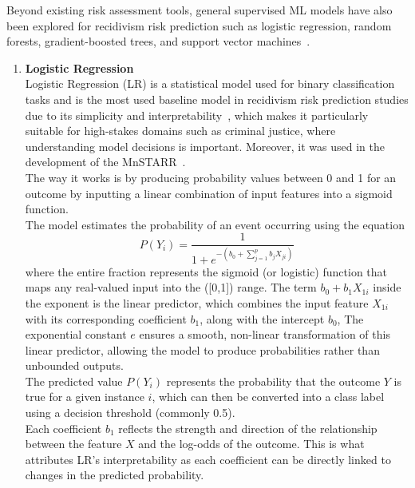 \documentclass[12pt]{article}
\begin{document}
Beyond existing risk assessment tools, general supervised ML models have also been explored for recidivism risk prediction such as logistic regression, random forests, gradient-boosted trees, and support vector machines~\cite{duwe2017out,ozkan2017predicting,ngo2018traditional}.

\begin{enumerate}
 \item \textbf{Logistic Regression} \\
  \tab Logistic Regression (LR) is a statistical model used for binary classification tasks and is the most used baseline model in recidivism risk prediction studies due to its simplicity and interpretability~\cite{travaini2022machine}, which makes it particularly suitable for high-stakes domains such as criminal justice, where understanding model decisions is important. Moreover, it was used in the development of the MnSTARR~\cite{duwe2014development}.\\

  The way it works is by producing probability values between 0 and 1 for an outcome by inputting a linear combination of input features into a sigmoid function. \\
  
  The model estimates the probability of an event occurring using the equation \[ P(Y_i)=\frac{1}{1+e^{-(b_0+\sum_{j=1}^{p} b_j X_{ji})}} \] where the entire fraction represents the sigmoid (or logistic) function that maps any real-valued input into the ([0,1]) range. The term $ b_0 + b_1X_{1i} $ inside the exponent is the linear predictor, which combines the input feature $ X_{1i} $ with its corresponding coefficient $ b_1 $, along with the intercept $ b_0 $, The exponential constant $ e $ ensures a smooth, non-linear transformation of this linear predictor, allowing the model to produce probabilities rather than unbounded outputs.\\
  
  The predicted value $ P(Y_i) $ represents the probability that the outcome $ Y $ is true for a given instance $ i $, which can then be converted into a class label using a decision threshold (commonly 0.5).\\
  
  Each coefficient $ b_1 $ reflects the strength and direction of the relationship between the feature $ X $ and the log-odds of the outcome. This is what attributes LR's interpretability as each coefficient can be directly linked to changes in the predicted probability.\\


\end{enumerate}
\end{document}
